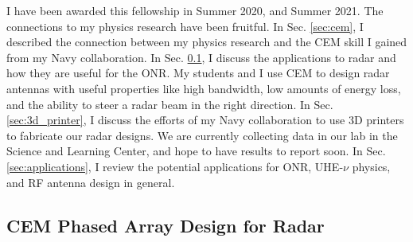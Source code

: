\documentclass[../../../main.tex]{subfiles}
\begin{document}
I have been awarded this fellowship in Summer 2020, and Summer 2021.  The connections to my physics research have been fruitful.  In Sec. \ref{sec:cem}, I described the connection between my physics research and the CEM skill I gained from my Navy collaboration.  In Sec. \ref{sec:phased_array}, I discuss the applications to radar and how they are useful for the ONR.  My students and I use CEM to design radar antennas with useful properties like high bandwidth, low amounts of energy loss, and the ability to steer a radar beam in the right direction.  In Sec. \ref{sec:3d_printer}, I discuss the efforts of my Navy collaboration to use 3D printers to fabricate our radar designs.  We are currently collecting data in our lab in the Science and Learning Center, and hope to have results to report soon.  In Sec. \ref{sec:applications}, I review the potential applications for ONR, UHE-$\nu$ physics, and RF antenna design in general.

\subsection{CEM Phased Array Design for Radar}
\label{sec:phased_array}
\end{document}
